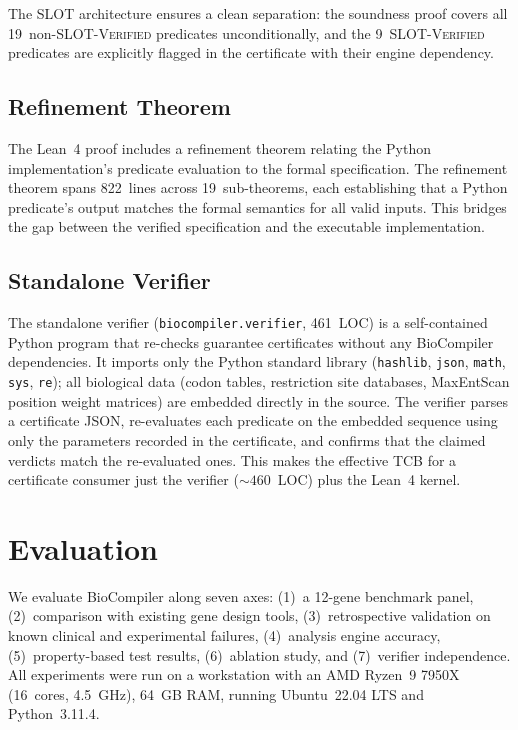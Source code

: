 The SLOT architecture ensures a clean separation: the soundness proof
covers all 19~non-SLOT-\textsc{Verified} predicates unconditionally, and
the 9~SLOT-\textsc{Verified} predicates are explicitly flagged in the
certificate with their engine dependency.

\subsection{Refinement Theorem}

The Lean~4 proof includes a refinement theorem relating the Python
implementation's predicate evaluation to the formal specification.  The
refinement theorem spans 822~lines across 19~sub-theorems, each
establishing that a Python predicate's output matches the formal
semantics for all valid inputs.  This bridges the gap between the
verified specification and the executable implementation.

\subsection{Standalone Verifier}

The standalone verifier (\texttt{biocompiler.verifier}, 461~LOC) is a
self-contained Python program that re-checks guarantee certificates
without any BioCompiler dependencies.  It imports only the Python
standard library (\texttt{hashlib}, \texttt{json}, \texttt{math},
\texttt{sys}, \texttt{re}); all biological data (codon tables,
restriction site databases, MaxEntScan position weight matrices) are
embedded directly in the source.  The verifier parses a certificate JSON,
re-evaluates each predicate on the embedded sequence using only the
parameters recorded in the certificate, and confirms that the claimed
verdicts match the re-evaluated ones.  This makes the effective TCB for a
certificate consumer just the verifier (${\sim}460$~LOC) plus the
Lean~4 kernel.


\section{Evaluation}\label{sec:eval}

We evaluate BioCompiler along seven axes: (1)~a 12-gene benchmark panel,
(2)~comparison with existing gene design tools, (3)~retrospective
validation on known clinical and experimental failures, (4)~analysis
engine accuracy, (5)~property-based test results, (6)~ablation study,
and (7)~verifier independence.  All experiments were run on a
workstation with an AMD Ryzen~9 7950X (16~cores, 4.5~GHz), 64~GB RAM,
running Ubuntu~22.04 LTS and Python~3.11.4.

